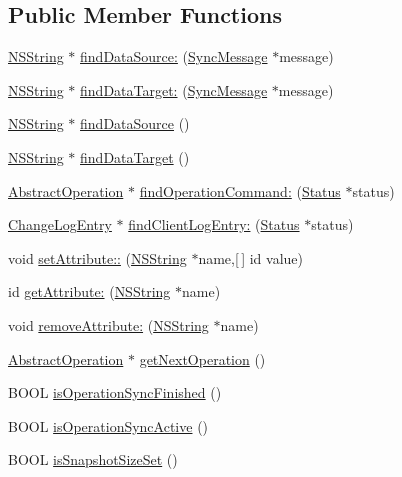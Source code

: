 \subsection*{\-Public \-Member \-Functions}
\begin{DoxyCompactItemize}
\item 
\hyperlink{class_n_s_string}{\-N\-S\-String} $\ast$ \hyperlink{interface_session_ad0d93bd00c6a7ba4c95257571886423c}{find\-Data\-Source\-:} (\hyperlink{interface_sync_message}{\-Sync\-Message} $\ast$message)
\item 
\hyperlink{class_n_s_string}{\-N\-S\-String} $\ast$ \hyperlink{interface_session_af0cb145bf4a3db91991bb348bff540e2}{find\-Data\-Target\-:} (\hyperlink{interface_sync_message}{\-Sync\-Message} $\ast$message)
\item 
\hyperlink{class_n_s_string}{\-N\-S\-String} $\ast$ \hyperlink{interface_session_a21da035a25ad0292ca1517acd008ec33}{find\-Data\-Source} ()
\item 
\hyperlink{class_n_s_string}{\-N\-S\-String} $\ast$ \hyperlink{interface_session_a01ae9d91dde11dc0842a94a16db723cd}{find\-Data\-Target} ()
\item 
\hyperlink{interface_abstract_operation}{\-Abstract\-Operation} $\ast$ \hyperlink{interface_session_a46def7766c05ca82f5ff6c5aa9b55be6}{find\-Operation\-Command\-:} (\hyperlink{interface_status}{\-Status} $\ast$status)
\item 
\hyperlink{interface_change_log_entry}{\-Change\-Log\-Entry} $\ast$ \hyperlink{interface_session_ad174f6009629ba580d236c4d97126e71}{find\-Client\-Log\-Entry\-:} (\hyperlink{interface_status}{\-Status} $\ast$status)
\item 
void \hyperlink{interface_session_aaa98df920a79a516f65453f1316fe291}{set\-Attribute\-::} (\hyperlink{class_n_s_string}{\-N\-S\-String} $\ast$name,\mbox{[}$\,$\mbox{]} id value)
\item 
id \hyperlink{interface_session_a6ded3ac7939359bddc5717e624af015f}{get\-Attribute\-:} (\hyperlink{class_n_s_string}{\-N\-S\-String} $\ast$name)
\item 
void \hyperlink{interface_session_a1493466538c27b3cb6624e5be1f9a9bf}{remove\-Attribute\-:} (\hyperlink{class_n_s_string}{\-N\-S\-String} $\ast$name)
\item 
\hyperlink{interface_abstract_operation}{\-Abstract\-Operation} $\ast$ \hyperlink{interface_session_ac8e3971996a916c58893bd82c98e649b}{get\-Next\-Operation} ()
\item 
\-B\-O\-O\-L \hyperlink{interface_session_a09eabaf2b36cbd3400b614fafb670b4e}{is\-Operation\-Sync\-Finished} ()
\item 
\-B\-O\-O\-L \hyperlink{interface_session_ad052defed1527189d4af34d795e21db2}{is\-Operation\-Sync\-Active} ()
\item 
\-B\-O\-O\-L \hyperlink{interface_session_a5bc34d4770498a53b74e455e7fcc09ba}{is\-Snapshot\-Size\-Set} ()
\end{DoxyCompactItemize}
